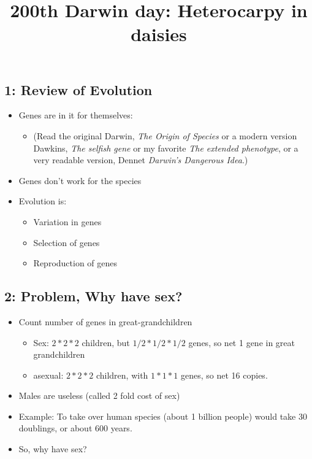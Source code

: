 \documentclass[12pt,twocolumn]{article}
\begin{document}
\pagestyle{empty}
\title{200th Darwin day: Heterocarpy in daisies}
\maketitle
\thispagestyle{empty}
\pagestyle{empty}

\subsection*{1: Review of Evolution}
\begin{itemize}
\item Genes are in it for themselves: 
\begin{itemize}
\item (Read the original Darwin, {\em
The Origin of Species} or a modern version Dawkins, {\em The selfish
gene} or my favorite {\em The extended phenotype}, or a very readable
version, Dennet {\em Darwin's Dangerous Idea}.) 
\end{itemize}
\item Genes don't work for the species
\item Evolution is:
\begin{itemize}
\item Variation in genes
\item Selection of genes
\item Reproduction of genes
\end{itemize}
\end{itemize}

\subsection*{2: Problem, Why have sex?}
\begin{itemize}
\item Count number of genes in great-grandchildren
\begin{itemize}
\item Sex: $2 * 2 * 2$ children, but $1/2 * 1/2 * 1/2$ genes, so net 1
gene in great grandchildren
\item asexual: $2 * 2 * 2$ children, with $1 * 1 * 1$ genes, so net 16
copies. 
\end{itemize}
\item Males are useless (called 2 fold cost of sex)
\item Example: To take over human species (about 1 billion people) would take
30 doublings, or about 600 years.
\item So, why have sex?
\end{itemize}
\end{document}
